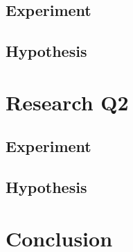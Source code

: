 \documentclass[sigconf,authorversion,nonacm]{acmart}
\begin{document}
\subsection{Experiment} 

\subsection{Hypothesis} 

\section{Research Q2}

\subsection{Experiment} 

\subsection{Hypothesis} 

\section{Conclusion} 

 \section*{}
 
\end{document}
